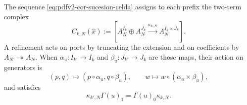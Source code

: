 The sequence \eqref{eq:pdfv2-cor-sucesion-celda} assigns to each prefix the
two-term complex
\begin{equation}
\label{eq:pdfv2-cor-cono-celda}
 C_{k,N}(\widehat x):=
 \left[A_N^{I_k}\oplus A_N^{J_k}
 \xrightarrow{\kappa_{k,N}}A_N^{I_k\times J_k}\right].
\end{equation}
A refinement acts on ports by truncating the extension and on coefficients
by \(A_{N'}\twoheadrightarrow A_N\). When \(\alpha_u:I_{k'}\to I_k\) and \(\beta_u:J_{k'}\to J_k\) are those maps, their
action on generators is
\begin{equation}
\label{eq:pdfv2-cor-refinamiento-celda}
 (p,q)\longmapsto(p\circ\alpha_u,q\circ\beta_u),
 \qquad
 w\longmapsto w\circ(\alpha_u\times\beta_u),
\end{equation}
and satisfies
\begin{equation}
\label{eq:pdfv2-cor-refinamiento-cadena}
 \kappa_{k',N}\Gamma(u)_1=\Gamma(u)_0\kappa_{k,N}.
\end{equation}

